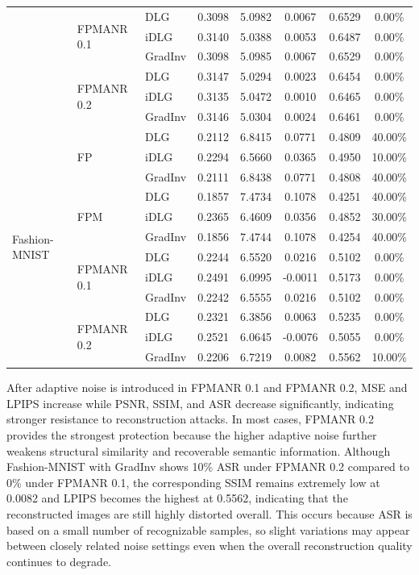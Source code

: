 \documentclass[a4paper,fleqn]{cas-dc}
\begin{document}
\begin{table}
\begin{tabular}{l l l c c c c c}
 & \multirow{3}{*}{FPMANR 0.1} & DLG & 0.3098 & 5.0982 & 0.0067 & 0.6529 & 0.00\% \\
 &  & iDLG & 0.3140 & 5.0388 & 0.0053 & 0.6487 & 0.00\% \\
 &  & GradInv & 0.3098 & 5.0985 & 0.0067 & 0.6529 & 0.00\% \\
 & \multirow{3}{*}{FPMANR 0.2} & DLG & 0.3147 & 5.0294 & 0.0023 & 0.6454 & 0.00\% \\
 &  & iDLG & 0.3135 & 5.0472 & 0.0010 & 0.6465 & 0.00\% \\
 &  & GradInv & 0.3146 & 5.0304 & 0.0024 & 0.6461 & 0.00\% \\
\midrule
\multirow{12}{*}{Fashion-MNIST} & \multirow{3}{*}{FP} & DLG & 0.2112 & 6.8415 & 0.0771 & 0.4809 & 40.00\% \\
 &  & iDLG & 0.2294 & 6.5660 & 0.0365 & 0.4950 & 10.00\% \\
 &  & GradInv & 0.2111 & 6.8438 & 0.0771 & 0.4808 & 40.00\% \\
 & \multirow{3}{*}{FPM} & DLG & 0.1857 & 7.4734 & 0.1078 & 0.4251 & 40.00\% \\
 &  & iDLG & 0.2365 & 6.4609 & 0.0356 & 0.4852 & 30.00\% \\
 &  & GradInv & 0.1856 & 7.4744 & 0.1078 & 0.4254 & 40.00\% \\
 & \multirow{3}{*}{FPMANR 0.1} & DLG & 0.2244 & 6.5520 & 0.0216 & 0.5102 & 0.00\% \\
 &  & iDLG & 0.2491 & 6.0995 & -0.0011 & 0.5173 & 0.00\% \\
 &  & GradInv & 0.2242 & 6.5555 & 0.0216 & 0.5102 & 0.00\% \\
 & \multirow{3}{*}{FPMANR 0.2} & DLG & 0.2321 & 6.3856 & 0.0063 & 0.5235 & 0.00\% \\
 &  & iDLG & 0.2521 & 6.0645 & -0.0076 & 0.5055 & 0.00\% \\
 &  & GradInv & 0.2206 & 6.7219 & 0.0082 & 0.5562 & 10.00\% \\
\bottomrule
\end{tabular}
\end{table}

After adaptive noise is introduced in FPMANR 0.1 and FPMANR 0.2, MSE and LPIPS increase while PSNR, SSIM, and ASR decrease significantly, indicating stronger resistance to reconstruction attacks. In most cases, FPMANR 0.2 provides the strongest protection because the higher adaptive noise further weakens structural similarity and recoverable semantic information. Although Fashion-MNIST with GradInv shows 10\% ASR under FPMANR 0.2 compared to 0\% under FPMANR 0.1, the corresponding SSIM remains extremely low at 0.0082 and LPIPS becomes the highest at 0.5562, indicating that the reconstructed images are still highly distorted overall. This occurs because ASR is based on a small number of recognizable samples, so slight variations may appear between closely related noise settings even when the overall reconstruction quality continues to degrade.
\end{document}
